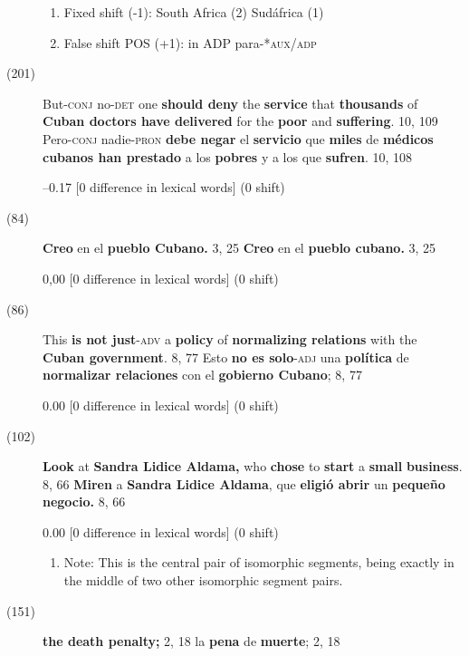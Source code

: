 \documentclass[output=paper]{langsci/langscibook}
\begin{document}
\begin{description}
    \begin{enumerate}
      \item Fixed shift (-1): South Africa (2) \rightarrow Sudáfrica (1)
      \item False shift POS (+1): in ADP \rightarrow para\textsc{-*aux/adp}
    \end{enumerate}

  \item[(201)] But\textsc{-conj} no\textsc{-det} one \textbf{should deny} the \textbf{service} that \textbf{thousands} of \textbf{Cuban doctors have delivered} for the \textbf{poor} and \textbf{suffering}. 10, 109 \rightarrow Pero\textsc{-conj} nadie\textsc{-pron} \textbf{debe negar} el \textbf{servicio} que \textbf{miles} de \textbf{médicos cubanos han prestado} a los \textbf{pobres} y a los que \textbf{sufren}. 10, 108

    --0.17 [0 difference in lexical words] (0 shift)

  \item[(84)] \textbf{Creo} en el \textbf{pueblo Cubano.} 3, 25 \rightarrow \textbf{Creo} en el \textbf{pueblo cubano.} 3, 25

    0,00 [0 difference in lexical words] (0 shift)

  \item[(86)] This \textbf{is not just}-\textsc{adv} a \textbf{policy} of \textbf{normalizing relations} with the \textbf{Cuban government}. 8, 77 \rightarrow Esto \textbf{no es solo}\textsc{-adj} una \textbf{política} de \textbf{normalizar relaciones} con el \textbf{gobierno Cubano}; 8, 77

    0.00 [0 difference in lexical words] (0 shift)

  \item[(102)] \textbf{Look} at \textbf{Sandra Lidice Aldama,} who \textbf{chose} to \textbf{start} a \textbf{small} \textbf{business}. 8, 66 \rightarrow \textbf{Miren} a \textbf{Sandra Lidice Aldama}, que \textbf{eligió abrir} un \textbf{pequeño negocio.} 8, 66

    0.00 [0 difference in lexical words] (0 shift)

    \begin{enumerate}
      \item Note: This is the central pair of isomorphic segments, being exactly in the middle of two other isomorphic segment pairs.
    \end{enumerate}

  \item[(151)] \textbf{the death penalty;} 2, 18 \rightarrow la \textbf{pena} de \textbf{muerte}; 2, 18 


\end{description}
\end{document}
